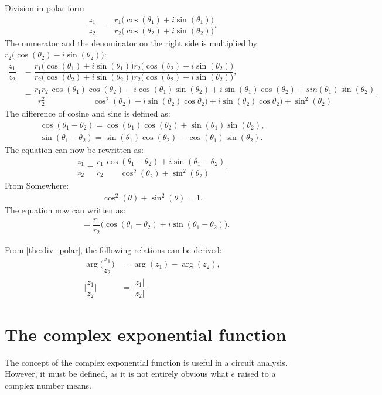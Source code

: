 \begin{prof}{Division in polar form}{}
\begin{align*}
\dfrac{z_1}{z_2}&=\dfrac{r_1\Big(\cos(\theta_1)+i\sin(\theta_1)\Big)}{r_2\Big(\cos(\theta_2)+i\sin(\theta_2)\Big)}.
\end{align*}
The numerator and the denominator on the right side is multiplied by $r_2\Big(\cos(\theta_2)-i\sin(\theta_2)\Big)$:
\begin{align*}
\dfrac{z_1}{z_2}&=\dfrac{r_1\Big(\cos(\theta_1)+i\sin(\theta_1)\Big)r_2\Big(\cos(\theta_2)-i\sin(\theta_2)\Big)}{r_2\Big(\cos(\theta_2)+i\sin(\theta_2)\Big)r_2\Big(\cos(\theta_2)-i\sin(\theta_2)\Big)},
\\
&=\dfrac{r_1 r_2}{r_2^2}\dfrac{\cos(\theta_1)\cos(\theta_2)-i\cos(\theta_1)\sin(\theta_2)+i\sin(\theta_1)\cos(\theta_2)+sin(\theta_1)\sin(\theta_2)}{\cos^2(\theta_2)-i\sin(\theta_2)\cos\theta_2)+i\sin(\theta_2)\cos\theta_2)+\sin^2(\theta_2)}.
\end{align*}
The difference of cosine and sine is defined as:
\begin{align*}
\cos(\theta_1-\theta_2)=\cos(\theta_1)\cos(\theta_2)+\sin(\theta_1)\sin(\theta_2),
\\
\sin(\theta_1-\theta_2)=\sin(\theta_1)\cos(\theta_2)-\cos(\theta_1)\sin(\theta_2).
\end{align*}
The equation can now be rewritten as:
\begin{align*}
\dfrac{z_1}{z_2}=\dfrac{r_1}{r_2}\dfrac{\cos(\theta_1-\theta_2)+i\sin(\theta_1-\theta_2)}{\cos^2(\theta_2)+\sin^2(\theta_2)}.
\end{align*}
From Somewhere:
\begin{align*}
\cos^2(\theta)+\sin^2(\theta)=1.
\end{align*}
The equation now can written as:
\begin{align*}
&=\dfrac{r_1}{r_2}\Big( \cos(\theta_1-\theta_2)+ i \sin(\theta_1-\theta_2)\Big).
\end{align*}
\end{prof}
\noindent From \cref{the:div_polar}, the following relations can be derived:
\begin{align}
\arg\Big(\dfrac{z_1}{z_2}\Big)&=\arg(z_1)-\arg(z_2),
\\
\Big|\dfrac{z_1}{z_2}\Big|&=\dfrac{|z_1|}{|z_2|}. \label{eq:mod_div}
\end{align}

\section{The complex exponential function}
The concept of the complex exponential function is useful in a circuit analysis. However, it must be defined, as it is not entirely obvious what $e$ raised to a complex number means.


